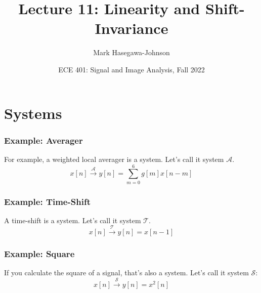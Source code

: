 \documentclass{beamer}
\title{Lecture 11: Linearity and Shift-Invariance}
\author{Mark Hasegawa-Johnson}
\date{ECE 401: Signal and Image Analysis, Fall 2022}
\begin{document}
\begin{frame}
  \maketitle
\end{frame}

\begin{frame}
  \tableofcontents
\end{frame}

\section[Systems]{Systems}
\setcounter{subsection}{1}


\begin{frame}
  \frametitle{Example: Averager}

  For example, a weighted local averager is a system.  Let's call it
  system ${\mathcal A}$.
  \[
  x[n]\stackrel{\mathcal A}{\longrightarrow} y[n]=\sum_{m=0}^6 g[m] x[n-m]
  \]
\end{frame}

\begin{frame}
  \frametitle{Example: Time-Shift}

  A time-shift is a system.  Let's call it
  system ${\mathcal T}$.
  \[
  x[n]\stackrel{\mathcal T}{\longrightarrow} y[n]=x[n-1]
  \]
\end{frame}

\begin{frame}
  \frametitle{Example: Square}

  If you calculate the square of a signal, that's also a system.
  Let's call it system ${\mathcal S}$:
  \[
  x[n]\stackrel{\mathcal S}{\longrightarrow} y[n]=x^2[n]
  \]
  
\end{frame}
\end{document}
